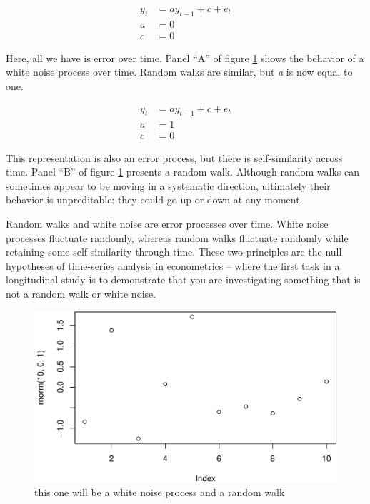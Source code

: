 \documentclass[english,,man]{apa6}
\theoremstyle{definition}
\theoremstyle{definition}
\theoremstyle{definition}
\theoremstyle{remark}
\begin{document}
\begin{equation}
\begin{split}
\label{whitenoise}
y_{t} &= a y_{t-1} + c + e_{t} \\
a &= 0 \\
c &= 0
\end{split}
\end{equation}

\noindent Here, all we have is error over time. Panel \enquote{A} of
figure \ref{noise} shows the behavior of a white noise process over
time. Random walks are similar, but \emph{a} is now equal to one.

\begin{equation}
\begin{split}
\label{rw}
y_{t} &= a y_{t-1} + c + e_{t} \\ 
a &= 1 \\ 
c &= 0
\end{split}
\end{equation}

\noindent This representation is also an error process, but there is
self-similarity across time. Panel \enquote{B} of figure \ref{noise}
presents a random walk. Although random walks can sometimes appear to be
moving in a systematic direction, ultimately their behavior is
unpreditable: they could go up or down at any moment.

Random walks and white noise are error processes over time. White noise
processes fluctuate randomly, whereas random walks fluctuate randomly
while retaining some self-similarity through time. These two principles
are the null hypotheses of time-series analysis in econometrics -- where
the first task in a longitudinal study is to demonstrate that you are
investigating something that is not a random walk or white noise.

\begin{figure}
\centering
\includegraphics{figs/unnamed-chunk-8-1.pdf}
\caption{\label{fig:unnamed-chunk-8}this one will be a white noise process
and a random walk\label{noise}}
\end{figure}
\end{document}
